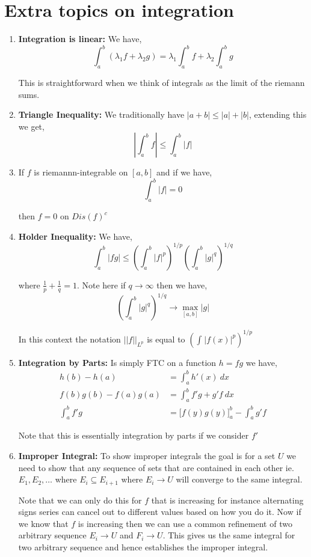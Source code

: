 \section{Extra topics on integration}
\begin{enumerate}
  \item \textbf{Integration is linear: }We have, 
\[
  \int_{a}^{b} (\lambda_{1}  f + \lambda_{2} g) = \lambda_{1} \int_{a}^{b} f+ \lambda_{2} \int_{a}^{b} g
\]

This is straightforward when we think of integrals as the limit of the riemann sums.

\item \textbf{Triangle Inequality:} We traditionally have $|a + b| \le |a| + |b|$, extending this we get, 
\[
  \left | \int_{a}^{b} f\right |\le \int_{a}^{b} |f|
\]

\item If $f$ is riemannn-integrable on $[a, b]$ and if we have, 
\[
  \int_{a}^{b} |f| = 0
\]

then $f = 0$ on $Dis(f)^{c}$

\item \textbf{Holder Inequality: } We have, 
\[
  \int_{a}^{b} |fg| \le \left (\int_{a}^{b} |f|^{p} \right)^{1 / p} \left (\int_{a}^{b} |g|^{q} \right)^{1 / q}
\]

where $\frac{1}{p} + \frac{1}{q} = 1$. Note here if $q \to \infty$ then we have, 
\[
  \left ( \int_{a}^{b} |g|^{q}\right )^{1 / q} \to \max_{[a,b]} |g|
\]

In this context the notation $\left | \left | f\right |\right |_{L^{p}}$ is equal to $\left ( \int_{}^{} |f(x)|^{p}\right )^{1 / p}$

\item \textbf{Integration by Parts: } Is simply FTC on a function $h = fg$ we have, 
  \begin{align*}
    h(b) - h(a) &= \int_{a}^{b}  h'(x) \ dx\\
    f(b)g(b) - f(a)g(a) &= \int_{a}^{b}  f'g + g'f \ dx\\
    \int_{a}^{b}  f'g  &=     [f(y)g(y)\big]_a^{b} - \int_{a}^{b}  g'f 
  \end{align*}

  Note that this is essentially integration by parts if we consider $f'$ 
\item \textbf{Improper Integral:} To show improper integrals the goal is for a set $U$ we need to show that any sequence of sets that are contained in each other ie. $E_{1}, E_{2}, \dots$  where $E_i \subseteq E_{i + 1}$ where $E_i \to U$ will converge to the same integral.

  \vspace{1em}
  
Note that we can only do this for $f$ that is increasing for instance alternating signs series can cancel out to different values based on how you do it. Now if we know that $f$ is increasing then we can use a common refinement of two arbitrary sequence $E_i \to U$ and $F_i \to U$. This gives us the same integral for two arbitrary sequence and hence establishes the improper integral.

\end{enumerate}

